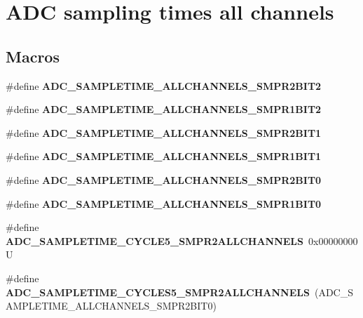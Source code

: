 \hypertarget{group___a_d_c__sampling__times__all__channels}{}\section{A\+DC sampling times all channels}
\label{group___a_d_c__sampling__times__all__channels}
\subsection*{Macros}
\begin{DoxyCompactItemize}
\item 
\#define {\bfseries A\+D\+C\+\_\+\+S\+A\+M\+P\+L\+E\+T\+I\+M\+E\+\_\+\+A\+L\+L\+C\+H\+A\+N\+N\+E\+L\+S\+\_\+\+S\+M\+P\+R2\+B\+I\+T2}
\item 
\#define {\bfseries A\+D\+C\+\_\+\+S\+A\+M\+P\+L\+E\+T\+I\+M\+E\+\_\+\+A\+L\+L\+C\+H\+A\+N\+N\+E\+L\+S\+\_\+\+S\+M\+P\+R1\+B\+I\+T2}
\item 
\#define {\bfseries A\+D\+C\+\_\+\+S\+A\+M\+P\+L\+E\+T\+I\+M\+E\+\_\+\+A\+L\+L\+C\+H\+A\+N\+N\+E\+L\+S\+\_\+\+S\+M\+P\+R2\+B\+I\+T1}
\item 
\#define {\bfseries A\+D\+C\+\_\+\+S\+A\+M\+P\+L\+E\+T\+I\+M\+E\+\_\+\+A\+L\+L\+C\+H\+A\+N\+N\+E\+L\+S\+\_\+\+S\+M\+P\+R1\+B\+I\+T1}
\item 
\#define {\bfseries A\+D\+C\+\_\+\+S\+A\+M\+P\+L\+E\+T\+I\+M\+E\+\_\+\+A\+L\+L\+C\+H\+A\+N\+N\+E\+L\+S\+\_\+\+S\+M\+P\+R2\+B\+I\+T0}
\item 
\#define {\bfseries A\+D\+C\+\_\+\+S\+A\+M\+P\+L\+E\+T\+I\+M\+E\+\_\+\+A\+L\+L\+C\+H\+A\+N\+N\+E\+L\+S\+\_\+\+S\+M\+P\+R1\+B\+I\+T0}
\item 
\mbox{\label{group___a_d_c__sampling__times__all__channels_gaa1292c07842f46409fc83fc5bed6a685}} 
\#define {\bfseries A\+D\+C\+\_\+\+S\+A\+M\+P\+L\+E\+T\+I\+M\+E\+\_\+C\+Y\+C\+L\+E5\+\_\+\+S\+M\+P\+R2\+A\+L\+L\+C\+H\+A\+N\+N\+E\+LS}~0x00000000U
\item 
\mbox{\label{group___a_d_c__sampling__times__all__channels_ga6984867eaaaafa513cf3957f6efd8a92}} 
\#define {\bfseries A\+D\+C\+\_\+\+S\+A\+M\+P\+L\+E\+T\+I\+M\+E\+\_\+C\+Y\+C\+L\+E\+S5\+\_\+\+S\+M\+P\+R2\+A\+L\+L\+C\+H\+A\+N\+N\+E\+LS}~(A\+D\+C\+\_\+\+S\+A\+M\+P\+L\+E\+T\+I\+M\+E\+\_\+\+A\+L\+L\+C\+H\+A\+N\+N\+E\+L\+S\+\_\+\+S\+M\+P\+R2\+B\+I\+T0)

\end{DoxyCompactItemize}
